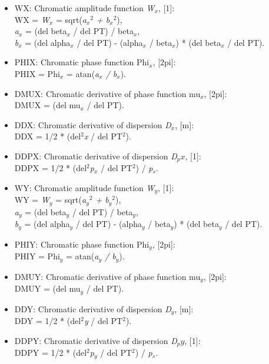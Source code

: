 \begin{itemize}
   \item WX: Chromatic amplitude function \textit{W$_x$}, [1]:\\
     WX = \textit{W$_x$} = sqrt(\textit{a$_x$$^2$ + b$_x$$^2$}),\\
     \textit{a$_x$} = (del beta$_\textit{x}$ / del PT) / beta$_\textit{x}$,\\
     \textit{b$_x$} = (del alpha$_\textit{x}$ / del PT) -
     (alpha$_\textit{x}$ / beta$_\textit{x}$) * (del beta$_\textit{x}$ /
     del PT).      
   \item PHIX: Chromatic phase function Phi$_\textit{x}$, [2pi]:\\
     PHIX = Phi$_\textit{x}$ = atan(\textit{a$_x$ / b$_x$}).     
   \item DMUX: Chromatic derivative of phase function mu$_\textit{x}$, [2pi]:\\
     DMUX = (del mu$_\textit{x}$ / del PT).     
   \item DDX: Chromatic derivative of dispersion \textit{D$_x$}, [m]:\\
     DDX = 1/2 * (del$^2$\textit{x} / del PT$^2$).     
   \item DDPX: Chromatic derivative of dispersion \textit{D$_px$}, [1]:\\
     DDPX = 1/2 * (del$^2$\textit{p$_x$} / del PT$^2$) / \textit{p$_s$}.     
   \item WY: Chromatic amplitude function \textit{W$_y$}, [1]:\\
     WY = \textit{W$_y$} = sqrt(\textit{a$_y$$^2$ + b$_y$$^2$}),\\     
     \textit{a$_y$} = (del beta$_\textit{y}$ / del PT) / beta$_\textit{y}$,\\     
     \textit{b$_y$} = (del alpha$_\textit{y}$ / del PT) -
     (alpha$_\textit{y}$ / beta$_\textit{y}$) * (del beta$_\textit{y}$ /
     del PT).     
   \item PHIY: Chromatic phase function Phi$_\textit{y}$, [2pi]:\\     
     PHIY = Phi$_\textit{y}$ = atan(\textit{a$_y$ / b$_y$}).     
   \item DMUY: Chromatic derivative of phase function mu$_\textit{y}$, [2pi]:\\     
     DMUY = (del mu$_\textit{y}$ / del PT).     
   \item DDY: Chromatic derivative of dispersion \textit{D$_y$}, [m]:\\     
     DDY = 1/2 * (del$^2$\textit{y} / del PT$^2$).     
   \item DDPY: Chromatic derivative of dispersion \textit{D$_py$}, [1]:\\ 
     DDPY = 1/2 * (del$^2$\textit{p$_y$} / del PT$^2$) / \textit{p$_s$}.     
\end{itemize}

